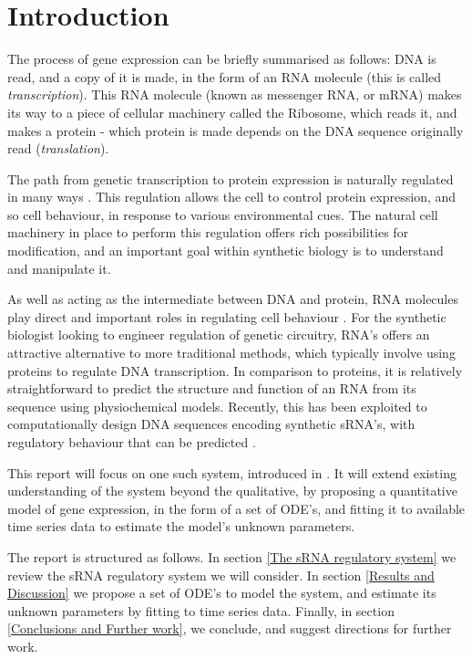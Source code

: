 \documentclass[10pt,journal]{./IEEE_latex_class/IEEEtran}
\begin{document}
\IEEEpeerreviewmaketitle


\section{Introduction}
\label{sec: Intro}
The process of gene expression can be briefly summarised as follows: DNA is read, and a copy of it is made, in the form of an RNA molecule (this is called \textit{transcription}). This RNA molecule (known as messenger RNA, or mRNA) makes its way to a piece of cellular machinery called the Ribosome, which reads it, and makes a protein - which protein is made depends on the DNA sequence originally read (\textit{translation}).  

 The path from genetic transcription to protein expression is naturally regulated in many ways \cite{MolecularBiology}. This regulation allows the cell to control protein expression, and so cell behaviour, in response to various environmental cues. The natural cell machinery in place to perform this regulation offers rich possibilities for modification, and an important goal within synthetic biology is to understand and manipulate it.

As well as acting as the intermediate between DNA and protein, RNA molecules play direct and important roles in regulating cell behaviour \cite{Isaacs2006}. For the synthetic biologist looking to engineer regulation of genetic circuitry, RNA's offers an attractive alternative to more traditional methods, which typically involve using proteins to regulate DNA transcription. In comparison to proteins, it is relatively straightforward to predict the structure and function of an RNA from its sequence using physiochemical models. Recently, this has been exploited to computationally design DNA sequences encoding synthetic sRNA's, with regulatory behaviour that can be predicted \cite{Rodrigo2013}\cite{Rodrigo2012}.

This report will focus on one such system, introduced in \cite{Rodrigo2012}. It will extend existing understanding of the system beyond the qualitative, by proposing a quantitative model of gene expression, in the form of a set of ODE's, and fitting it to available time series data to estimate the model's unknown parameters.

The report is structured as follows. In section \ref{The sRNA regulatory system} we review the sRNA regulatory system we will consider. In section \ref{Results and Discussion} 
we propose a set of ODE's to model the system, and estimate its unknown parameters by fitting to time series data. Finally, in section \ref{Conclusions and Further work}, we conclude, and suggest directions for further work.
\end{document}
